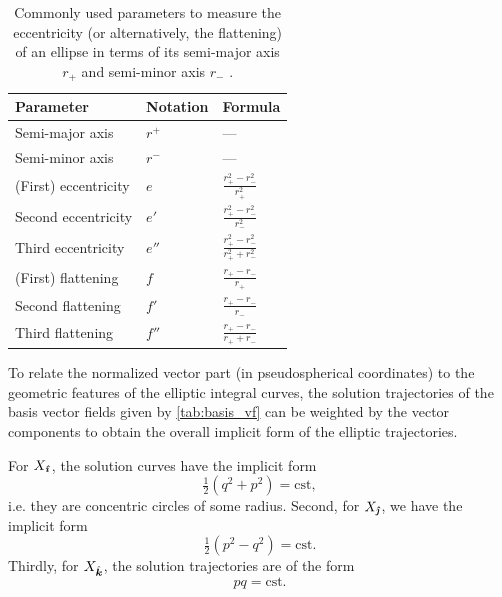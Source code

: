 \renewcommand{\arraystretch}{1.4}
\begin{table}[ht]
    \centering
    \caption{Commonly used parameters to measure the eccentricity (or alternatively, the flattening) of an ellipse in terms of its semi-major axis \(r_+\) and semi-minor axis \(r_-\) \cite{Rapp1991}.}
    \label{tab:ellipse}
    \begin{tabular}{lll}
    \toprule
        \textbf{Parameter} & \textbf{Notation} & \textbf{Formula} \\
    \midrule
        Semi-major axis & \(r^+\) & --- \\ 
        Semi-minor axis & \(r^-\) & --- \\
    \midrule
        (First) eccentricity & \(e\) & \(\displaystyle \frac{r_+^2 - r_-^2}{r_+^2}\) \\[0.3cm]
        Second eccentricity & \(e'\) & \(\displaystyle \frac{r_+^2 - r_-^2}{r_-^2}\) \\[0.3cm]
        Third eccentricity & \(e''\) & \(\displaystyle \frac{r_+^2 - r_-^2}{r_+^2 + r_-^2}\) \\[0.3cm]
    \midrule
        (First) flattening & \(f\) &   \(\displaystyle \frac{r_+ - r_-}{r_+}\) \\[0.3cm]
        Second flattening & \(f'\) &   \(\displaystyle \frac{r_+ - r_-}{r_-}\) \\[0.3cm]
        Third flattening & \(f''\) &   \(\displaystyle \frac{r_+ - r_-}{r_+ + r_-}\) \\[0.2cm]
    \bottomrule
    \end{tabular}
\end{table}
\renewcommand{\arraystretch}{1}

To relate the normalized vector part (in pseudospherical coordinates) to the geometric features of the elliptic integral curves, the solution trajectories of the basis vector fields given by \cref{tab:basis_vf} can be weighted by the vector components to obtain the overall implicit form of the elliptic trajectories.

For \(X_\quati\), the solution curves have the implicit form 
\begin{equation}
    \tfrac{1}{2}(q^2 + p^2) = \text{cst},
\end{equation}
i.e. they are concentric circles of some radius. Second, for \(X_\quatj\), we have the implicit form
\begin{equation}
    \tfrac{1}{2}(p^2 - q^2) = \text{cst}.
\end{equation}
Thirdly, for \(X_\quatk\), the solution trajectories are of the form
\begin{equation}
    pq = \text{cst}.
\end{equation}


